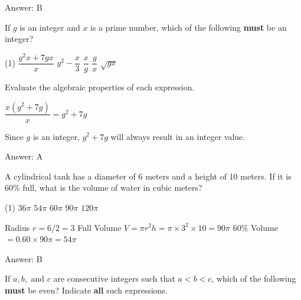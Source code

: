 \documentclass[11pt,paper=a4,answers]{exam}
\begin{document}
\begin{questions}
\begin{solution}
Answer: \colorbox{yellow!100}{B}
\end{solution}

\vspace{1cm}

\question
If $g$ is an integer and $x$ is a prime number, which of the following \textbf{must} be an integer?

\begin{tasks}(1)
\task[A)] $\dfrac{g^2x + 7gx}{x}$ \task[B)] $g^2 - \dfrac{x}{3}$ \task[C)] $\dfrac{x}{g}$ \task[D)] $\dfrac{g}{x}$ \task[E)] $\sqrt{gx}$
\end{tasks}

\begin{solution}
Evaluate the algebraic properties of each expression.
\vspace{5pt}
\begin{center}
$\dfrac{x(g^2 + 7g)}{x} = g^2 + 7g$
\end{center}
\vspace{5pt}
Since $g$ is an integer, $g^2 + 7g$ will always result in an integer value.

Answer: \colorbox{yellow!100}{A}
\end{solution}

\vspace{1cm}

\question
A cylindrical tank has a diameter of 6 meters and a height of 10 meters. If it is 60\% full, what is the volume of water in cubic meters?

\begin{tasks}(1)
\task[A)] $36\pi$ \task[B)] $54\pi$ \task[C)] $60\pi$ \task[D)] $90\pi$ \task[E)] $120\pi$
\end{tasks}

\begin{solution}
\begin{center}
Radius $r = 6 / 2 = 3$
\vspace{5pt}
Full Volume $V = \pi r^2 h = \pi \times 3^2 \times 10 = 90\pi$
\vspace{5pt}
60\% Volume $= 0.60 \times 90\pi = 54\pi$
\end{center}

Answer: \colorbox{yellow!100}{B}
\end{solution}

\vspace{1cm}


\question
If $a, b, \text{ and } c$ are consecutive integers such that $a < b < c$, which of the following \textbf{must} be even?
Indicate \textbf{all} such expressions.


\end{questions}
\end{document}
